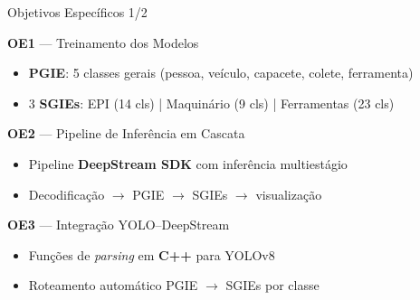 \begin{frame}{Objetivos Espec\'{i}ficos \hfill {\normalsize\color{sublabelcolor} 1/2}}
  \vfill

  {
  \begin{block}{{\scriptsize\textbf{OE1}} --- {\scriptsize Treinamento dos Modelos}}
    \begin{itemize}\scriptsize
      \item[\color{backbonecolor}$\blacktriangleright$] \textbf{PGIE}: 5 classes gerais (pessoa, ve\'{i}culo, capacete, colete, ferramenta)
      \item[\color{backbonecolor}$\blacktriangleright$] 3 \textbf{SGIEs}: EPI (14 cls) | Maquin\'{a}rio (9 cls) | Ferramentas (23 cls)
    \end{itemize}
  \end{block}
  }

  \vspace{1mm}

  {
  \begin{block}{{\scriptsize\textbf{OE2}} --- {\scriptsize Pipeline de Infer\^{e}ncia em Cascata}}
    \begin{itemize}\scriptsize
      \item[\color{neckcolor}$\blacktriangleright$] Pipeline \textbf{DeepStream SDK} com infer\^{e}ncia multiest\'{a}gio
      \item[\color{neckcolor}$\blacktriangleright$] Decodifica\c{c}\~{a}o $\to$ PGIE $\to$ SGIEs $\to$ visualiza\c{c}\~{a}o
    \end{itemize}
  \end{block}
  }

  \vspace{1mm}

  {
  \begin{block}{{\scriptsize\textbf{OE3}} --- {\scriptsize Integra\c{c}\~{a}o YOLO--DeepStream}}
    \begin{itemize}\scriptsize
      \item[\color{detectioncolor}$\blacktriangleright$] Fun\c{c}\~{o}es de \textit{parsing} em \textbf{C++} para YOLOv8
      \item[\color{detectioncolor}$\blacktriangleright$] Roteamento autom\'{a}tico PGIE $\to$ SGIEs por classe
    \end{itemize}
  \end{block}
  }

  \vfill
\end{frame}

